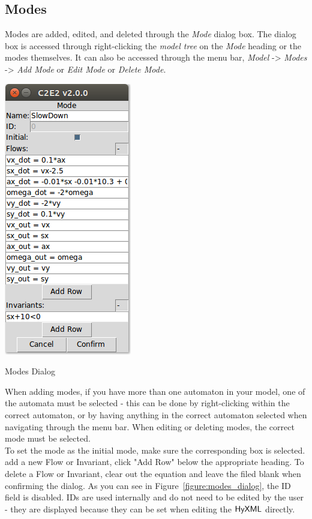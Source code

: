 \documentclass{tufte-book} %
\begin{document}
\subsection{Modes}
Modes are added, edited, and deleted through the \emph{Mode} dialog box. The dialog box is accessed through right-clicking the \emph{model tree} on the \emph{Mode} heading or the modes themselves. It can also be accessed through the menu bar, \emph{Model} -> \emph{Modes} -> \emph{Add Mode} or \emph{Edit Mode} or \emph{Delete Mode}.
\begin{marginfigure}
 \centerline{\includegraphics[scale=.25,keepaspectratio=true]{ManualImages/C2E2_version2.0/mode-dialog.png}}
 \caption{Modes Dialog} 
  \label{figure:modes_dialog}
\end{marginfigure}
When adding modes, if you have more than one automaton in your model, one of the automata must be selected - this can be done by right-clicking within the correct automaton, or by having anything in the correct automaton selected when navigating through the menu bar. When editing or deleting modes, the correct mode must be selected. \\
To set the mode as the initial mode, make sure the corresponding box is selected. add a new Flow or Invariant, click "Add Row" below the appropriate heading. To delete a Flow or Invariant, clear out the equation and leave the filed blank when confirming the dialog. As you can see in Figure~\ref{figure:modes_dialog}, the ID field is disabled. IDs are used internally and do not need to be edited by the user - they are displayed because they can be set when editing the ${{\sf HyXML}}$ directly. 
\end{document}
